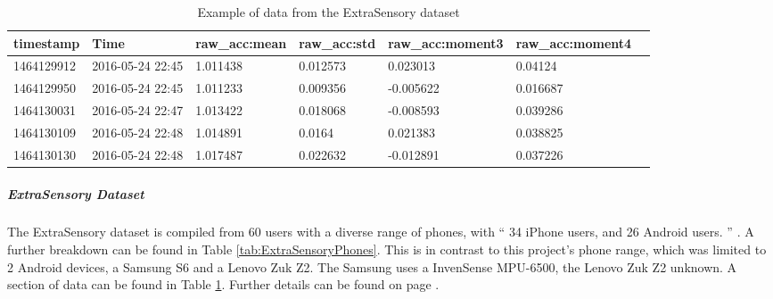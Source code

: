 \documentclass{UoNMCHA}
\newcommand{\inlineQuote}[1]{`` #1 ''}
\newcommand{\fancyquote}[1]{\begin{quotation}\inlineQuote{#1}\end{quotation}}
\newcommand{\tref}[1] {Table \ref{#1}}
\numberwithin{equation}{section}
\begin{document}
    
\begin{table}
    \begin{center}
        \caption{Example of data from the ExtraSensory dataset}\label{tab:ExtraSensoryDataExample}
        \begin{tabular}{lllllll}
            \hline\hline timestamp  & Time & raw\_acc:mean & raw\_acc:std & raw\_acc:moment3 & raw\_acc:moment4 \\\hline 
        1464129912 & 2016-05-24 22:45 & 1.011438                       & 0.012573                      & 0.023013                          & 0.04124      \\
        1464129950 & 2016-05-24 22:45 & 1.011233                       & 0.009356                      & -0.005622                         & 0.016687     \\
        1464130031 & 2016-05-24 22:47 & 1.013422                       & 0.018068                      & -0.008593                         & 0.039286     \\
        1464130109 & 2016-05-24 22:48 & 1.014891                       & 0.0164                        & 0.021383                          & 0.038825     \\
        1464130130 & 2016-05-24 22:48 & 1.017487                       & 0.022632                      & -0.012891                         & 0.037226    \\\hline 
        \end{tabular}
    \end{center}
\end{table}


\subparagraph{ExtraSensory Dataset}
The ExtraSensory dataset is compiled from 60 users with a diverse range of phones, with \inlineQuote{34 iPhone users, and 26 Android users.} \cite{Vaizman2017}. A further breakdown can be found in \tref{tab:ExtraSensoryPhones}. This is in contrast to this project's phone range, which was limited to 2 Android devices, a Samsung S6 and a Lenovo Zuk Z2. The Samsung uses a InvenSense MPU-6500, the Lenovo Zuk Z2 unknown. A section of data can be found in \tref{tab:ExtraSensoryDataExample}. Further details can be found on page \pageref{para:ExtraSensorydataset}.

\end{document}
